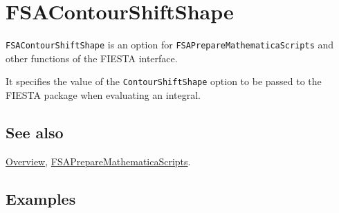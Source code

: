 \documentclass[../FeynHelpersManual.tex]{subfiles}
\begin{document}
\begin{Shaded}
\begin{Highlighting}[]
 
\end{Highlighting}
\end{Shaded}

\hypertarget{fsacontourshiftshape}{
\section{FSAContourShiftShape}\label{fsacontourshiftshape}}

\texttt{FSAContourShiftShape} is an option for
\texttt{FSAPrepareMathematicaScripts} and other functions of the FIESTA
interface.

It specifies the value of the \texttt{ContourShiftShape} option to be
passed to the FIESTA package when evaluating an integral.

\subsection{See also}

\hyperlink{toc}{Overview},
\hyperlink{fsapreparemathematicascripts}{FSAPrepareMathematicaScripts}.

\subsection{Examples}
\end{document}
